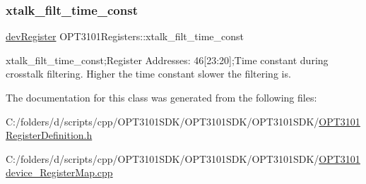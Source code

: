 \mbox{\label{class_o_p_t3101_registers_a998237de51882bdbb1c5192045ed76de}} 
\subsubsection{\texorpdfstring{xtalk\+\_\+filt\+\_\+time\+\_\+const}{xtalk\_filt\_time\_const}}
{\footnotesize\ttfamily \mbox{\hyperlink{classdev_register}{dev\+Register}} O\+P\+T3101\+Registers\+::xtalk\+\_\+filt\+\_\+time\+\_\+const}



xtalk\+\_\+filt\+\_\+time\+\_\+const;Register Addresses\+: 46\mbox{[}23\+:20\mbox{]};Time constant during crosstalk filtering. Higher the time constant slower the filtering is. 



The documentation for this class was generated from the following files\+:\begin{DoxyCompactItemize}
\item 
C\+:/folders/d/scripts/cpp/\+O\+P\+T3101\+S\+D\+K/\+O\+P\+T3101\+S\+D\+K/\+O\+P\+T3101\+S\+D\+K/\mbox{\hyperlink{_o_p_t3101_register_definition_8h}{O\+P\+T3101\+Register\+Definition.\+h}}\item 
C\+:/folders/d/scripts/cpp/\+O\+P\+T3101\+S\+D\+K/\+O\+P\+T3101\+S\+D\+K/\+O\+P\+T3101\+S\+D\+K/\mbox{\hyperlink{_o_p_t3101device___register_map_8cpp}{O\+P\+T3101device\+\_\+\+Register\+Map.\+cpp}}\end{DoxyCompactItemize}
